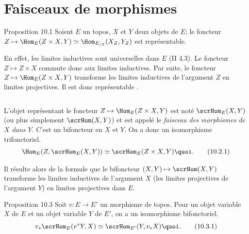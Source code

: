 \section{Faisceaux de morphismes}\pageoriginale

\begin{enonce*}{Proposition 10.1}
Soient $E$ un topos, $X$ et $Y$ deux objets de $E$; le foncteur
$Z\mapsto \Hom_E(Z\times X,Y)\simeq \Hom_{E_{/Z}}(X_Z, Y_Z)$ est
représentable.
\end{enonce*}

En effet, les limites inductives sont universelles dans $E$ (II
4.3). Le foncteur $Z\mapsto Z\times X$ commute donc aux limites
inductives. Par suite, le foncteur $Z\mapsto \Hom_E(Z\times X,Y)$
transforme les limites inductives de l'argument $Z$ en limites
projectives. Il est donc représentable .

\setcounter{subsection}{1}
\subsection{}
L'objet représentant le foncteur $Z\mapsto \Hom_{E}(Z\times X, Y)$
est noté $\scrHom_{E}(X,Y)$ (ou plus simplement $\scrHom(X,Y)$) et
est appelé le \emph{faisceau des morphismes de $X$ dans $Y$}. C'est
un bifoncteur en $X$ et $Y$. On a donc un isomorphisme
trifonctoriel.
\begin{equation*}
\Hom_E(Z,\scrHom_E(X,Y))\simeq \scrHom_E(Z\times X,
Y){\quoi}.\tag{10.2.1}
\end{equation*}

Il résulte alors de la formule  que le bifoncteur
$(X,Y)\mapsto \scrHom(X,Y)$ transforme les limites inductives de
l'argument $X$ (\resp les limites projectives de l'argument $Y$) en
limites projectives dans $E$.

\begin{enonce*}{Proposition 10.3}
Soit $v:E\rightarrow E'$ un morphisme de topos. Pour un objet
variable $X$ de $E$ et un objet variable $Y$ de $E'$, on a un
isomorphisme bifonctoriel.
\begin{equation*}
v_{\ast}\scrHom_E(v^{\ast}Y,X)\simeq
\scrHom_{E'}(Y,v_{\ast}X){\quoi}.\tag{10.3.1}
\end{equation*}
\end{enonce*}

